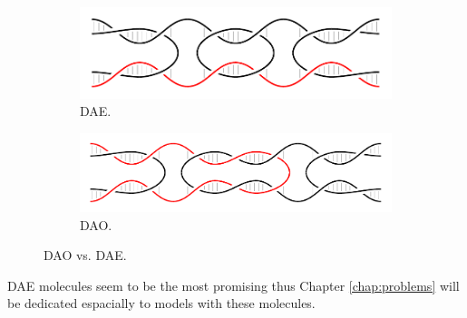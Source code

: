 		\begin{figure}[H]
		\begin{center}
			\begin{subfigure}[b]{0.433\textwidth} %
				\includegraphics[width=\textwidth]{./figures/dao-dae/dae.pdf}
				\caption{DAE.}
				\label{fig:dao}
			\end{subfigure}
			\begin{subfigure}[b]{0.5\textwidth} %
				\includegraphics[width=\textwidth]{./figures/dao-dae/dao.pdf}
				\caption{DAO.}
				\label{fig:dae}
			\end{subfigure}
			\caption{DAO vs. DAE.}
			\label{fig:dao-dae}
		\end{center}
		\end{figure}
		
		
		
		DAE molecules seem to be the most promising %
		thus Chapter \ref{chap:problems} will be dedicated espacially to models with these molecules.
		
		
